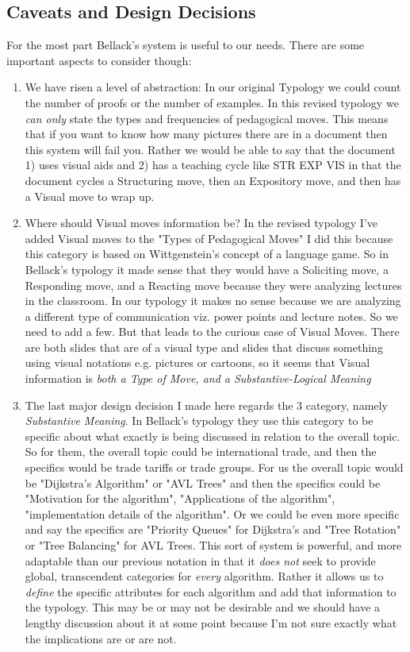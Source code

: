 \documentclass[10pt, letterpaper]{article}
\begin{document}
\subsection*{Caveats and Design Decisions}
\label{sec:org58cd3dd}
For the most part Bellack's system is useful to our needs. There are some important aspects to consider though:
\begin{enumerate}
\item We have risen a level of abstraction: In our original Typology we could count the number of proofs or the number of examples. In this revised typology we \emph{can only} state the types and frequencies of pedagogical moves. This means that if you want to know how many pictures there are in a document then this system will fail you. Rather we would be able to say that the document 1) uses visual aids and 2) has a teaching cycle like STR EXP VIS in that the document cycles a Structuring move, then an Expository move, and then has a Visual move to wrap up.
\item Where should Visual moves information be? In the revised typology I've added Visual moves to the "Types of Pedagogical Moves" I did this because this category is based on Wittgenstein's concept of a language game. So in Bellack's typology it made sense that they would have a Soliciting move, a Responding move, and a Reacting move because they were analyzing lectures in the classroom. In our typology it makes no sense because we are analyzing a different type of communication viz. power points and lecture notes. So we need to add a few. But that leads to the curious case of Visual Moves. There are both slides that are of a visual type and slides that discuss something using visual notations e.g. pictures or cartoons, so it seems that Visual information is \emph{both a Type of Move, and a Substantive-Logical Meaning}
\item The last major design decision I made here regards the 3 category, namely \emph{Substantive Meaning}. In Bellack's typology they use this category to be specific about what exactly is being discussed in relation to the overall topic. So for them, the overall topic could be international trade, and then the specifics would be trade tariffs or trade groups. For us the overall topic would be "Dijkstra's Algorithm" or "AVL Trees" and then the specifics could be "Motivation for the algorithm", "Applications of the algorithm", "implementation details of the algorithm". Or we could be even more specific and say the specifics are "Priority Queues" for Dijkstra's and "Tree Rotation" or "Tree Balancing" for AVL Trees. This sort of system is powerful, and more adaptable than our previous notation in that it \emph{does not} seek to provide global, transcendent categories for \emph{every} algorithm. Rather it allows us to \emph{define} the specific attributes for each algorithm and add that information to the typology. This may be or may not be desirable and we should have a lengthy discussion about it at some point because I'm not sure exactly what the implications are or are not.
\end{enumerate}
\end{document}
